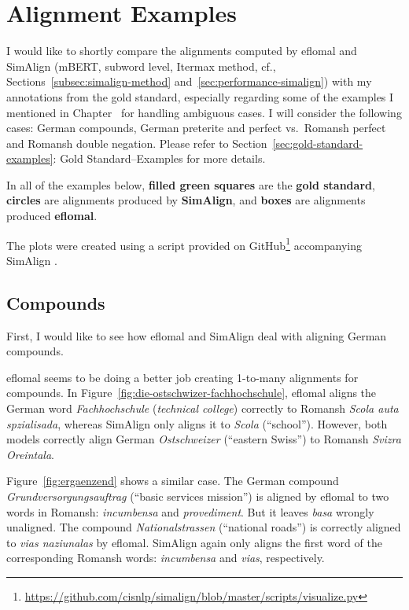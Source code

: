 \chapter{Alignment Examples}\label{appendix-a}

I would like to shortly compare the  alignments computed by eflomal and SimAlign (mBERT, subword level, Itermax method, cf., Sections~\ref{subsec:simalign-method} and~\ref{sec:performance-simalign}) with my annotations from the gold standard, especially regarding some of the examples I mentioned in Chapter~ for handling ambiguous cases.
I will consider the following cases: German compounds,  German preterite and perfect vs.~Romansh perfect and Romansh double negation. 
Please refer to Section~\ref{sec:gold-standard-examples}: Gold Standard--Examples for more details.

In all of the examples below, \textbf{filled green squares} are the \textbf{gold standard}, \textbf{circles} are alignments produced by \textbf{SimAlign}, and \textbf{boxes} are alignments produced \textbf{eflomal}. 

The plots were created using a script provided on GitHub\footnote{\url{https://github.com/cisnlp/simalign/blob/master/scripts/visualize.py}} accompanying SimAlign \autocite{jalili-sabet-etal-2020-simalign}.

\section{Compounds}
First, I would like to see how eflomal and SimAlign deal with aligning German compounds.

eflomal seems to be doing a better job creating 1-to-many alignments for compounds. 
In Figure~\ref{fig:die-ostschwizer-fachhochschule}, eflomal aligns  the German word \emph{Fachhochschule} (\emph{technical college}) correctly  to Romansh \emph{Scola auta spzialisada}, whereas SimAlign only aligns it to \emph{Scola} (\enquote{school}). 
However, both models correctly align German \emph{Ostschweizer} (\enquote{eastern Swiss}) to Romansh \emph{Svizra Oreintala}.

Figure~\ref{fig:ergaenzend} shows a similar case. The German compound \emph{Grundversorgungsauftrag} (\enquote{basic services mission}) is aligned by eflomal to two words in Romansh: \emph{incumbensa} and \emph{provediment}. But it leaves \emph{basa} wrongly unaligned. 
The compound \emph{Nationalstrassen} (\enquote{national roads}) is correctly aligned to \emph{vias naziunalas} by eflomal. SimAlign again only aligns the first word of the corresponding Romansh words: \emph{incumbensa}  and \emph{vias}, respectively.

